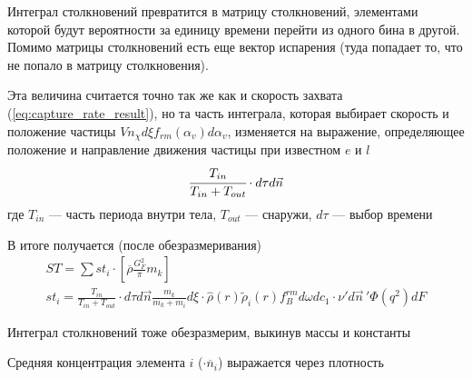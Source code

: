 Интеграл столкновений превратится в матрицу столкновений, элементами которой будут вероятности за единицу времени перейти из одного бина в другой. Помимо матрицы столкновений есть еще вектор испарения (туда попадает то, что не попало в матрицу столкновения).

Эта величина считается точно так же как и скорость захвата (\ref{eq:capture_rate_result}), но та часть интеграла, которая выбирает скорость и положение частицы $Vn_{\chi}d\xi f_{rm}\left( \alpha_{v} \right)d\alpha_{v}$, изменяется на выражение, определяющее положение и направление движения частицы при известном $e$ и $l$
\begin{equation}
	\cfrac{T_{in}}{T_{in}+T_{out}}\cdot d\tau d\vec{n}
\end{equation}
где $T_{in}$ --- часть периода внутри тела, $T_{out}$ --- снаружи, $d\tau$ --- выбор времени 

В итоге получается (после обезразмеривания)
\begin{align*}
	\label{eq:st}
	ST = \sum{st_i} \cdot \left[\overline{\rho} \frac{G_{F}^{2}}{\pi} m_k \right]
	\\
	st_{i} = \frac{T_{in}}{T_{in}+T_{out}}\cdot d\tau d\vec{n} \frac{m_k}{m_k+m_i}d\xi \cdot \widehat{\rho}(r) \widetilde{\rho}_i(r) f_{B}^{rm}d\omega dc_{1} \cdot \nu' d\vec{n}\,'\Phi\left( q^{2} \right)dF
\end{align*}


Интеграл столкновений тоже обезразмерим, выкинув массы и константы



Средняя концентрация элемента $i$ ($\cdot\overline{n}_{i}$) выражается через плотность


